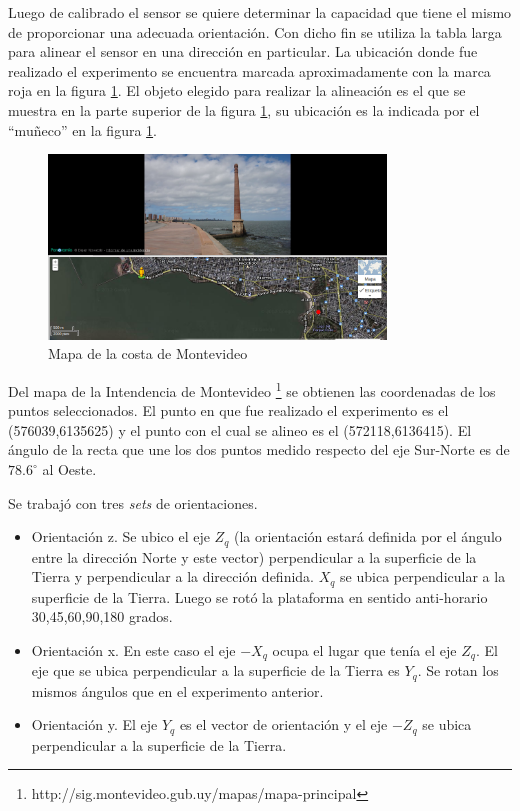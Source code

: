 \documentclass[spanish,12pt,a4paper,titlepage]{report}
\begin{document}
Luego de calibrado el sensor se quiere determinar la capacidad que tiene el mismo de proporcionar una adecuada orientación. Con dicho fin se utiliza la tabla larga para alinear el sensor en una dirección en particular. La ubicación donde fue realizado el experimento se encuentra marcada aproximadamente con la marca roja en la figura \ref{fig:mapa}. El objeto elegido para realizar la alineación es el que se muestra en la parte superior de la figura \ref{fig:mapa}, su ubicación es la indicada por el ``muñeco'' en la figura \ref{fig:mapa}.
\begin{figure}
  \begin{center}
	\includegraphics[width=0.8\textwidth]
		{./pics/mapa.png}
	
  \end{center}
  \caption{Mapa de la costa de Montevideo}
  \label{fig:mapa}
\end{figure}

Del mapa de la Intendencia de Montevideo \footnote{http://sig.montevideo.gub.uy/mapas/mapa-principal} se obtienen las coordenadas de los puntos seleccionados. El punto en que fue realizado el experimento es el (576039,6135625) y el punto con el cual se alineo es el (572118,6136415). El ángulo de la recta que une los dos puntos medido respecto del eje Sur-Norte es de $78.6^\circ$ al Oeste.

Se trabajó con tres \emph{sets} de orientaciones. 
\begin{itemize}
\item Orientación z. Se ubico el eje $Z_q$ (la orientación estará definida por el ángulo entre la dirección Norte y este vector) perpendicular a la superficie de la Tierra y perpendicular a la dirección definida. $X_q$ se ubica perpendicular a la superficie de la Tierra.  Luego se rotó la plataforma en sentido anti-horario 30,45,60,90,180 grados. 
\item Orientación x. En este caso el eje $-X_q$ ocupa el lugar que  tenía el eje $Z_q$. El eje que se ubica perpendicular a la superficie de la Tierra es $Y_q$. Se rotan los mismos ángulos que en el experimento anterior.
\item Orientación y. El eje $Y_q$ es el vector de orientación y el eje $-Z_q$ se ubica perpendicular a la superficie de la Tierra. 
\end{itemize} 
\end{document}
